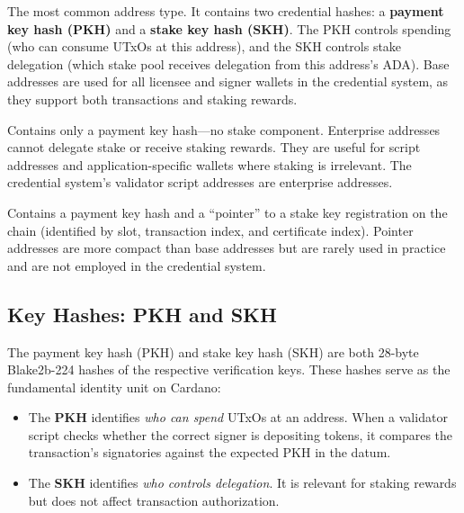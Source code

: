 \begin{description}[leftmargin=2.8cm, labelwidth=2.6cm]
  \item[Base Address] The most common address type. It contains two
    credential hashes: a \textbf{payment key hash (PKH)} and a
    \textbf{stake key hash (SKH)}. The PKH controls spending (who can
    consume UTxOs at this address), and the SKH controls stake
    delegation (which stake pool receives delegation from this address's
    ADA). Base addresses are used for all licensee and signer wallets in
    the credential system, as they support both transactions and staking
    rewards.

  \item[Enterprise Address] Contains only a payment key hash---no stake
    component. Enterprise addresses cannot delegate stake or receive
    staking rewards. They are useful for script addresses and
    application-specific wallets where staking is irrelevant. The
    credential system's validator script addresses are enterprise
    addresses.

  \item[Pointer Address] Contains a payment key hash and a ``pointer''
    to a stake key registration on the chain (identified by slot, transaction
    index, and certificate index). Pointer addresses are more compact
    than base addresses but are rarely used in practice and are not
    employed in the credential system.
\end{description}

\subsection{Key Hashes: PKH and SKH}

The payment key hash (PKH) and stake key hash (SKH) are both
28-byte Blake2b-224 hashes of the respective verification keys. These
hashes serve as the fundamental identity unit on Cardano:

\begin{itemize}[nosep]
  \item The \textbf{PKH} identifies \emph{who can spend} UTxOs at an
    address. When a validator script checks whether the correct signer
    is depositing tokens, it compares the transaction's signatories
    against the expected PKH in the datum.
  \item The \textbf{SKH} identifies \emph{who controls delegation}. It
    is relevant for staking rewards but does not affect transaction
    authorization.
\end{itemize}


